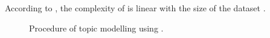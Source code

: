 According to \citeauthor{Topic2Vec2015}, the complexity of \topTwovec{} is linear with the size of the dataset \cite{Topic2Vec2015}.

\begin{figure}[htp] %
    \centering
    
    \caption{Procedure of topic modelling using \topTwovec{}.}
    \label{fig:top2vec}
\end{figure}